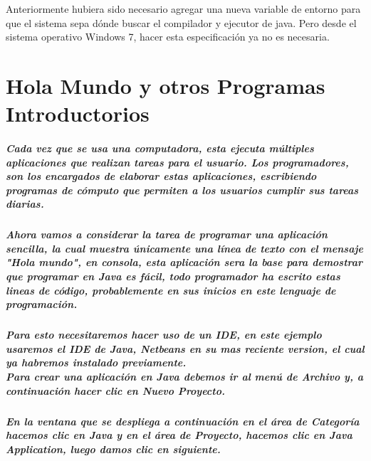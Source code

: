 \documentclass[12pt]{book} %
\begin{document}
Anteriormente hubiera sido necesario agregar una nueva variable de entorno para que el sistema sepa dónde buscar el compilador y ejecutor de java. Pero desde el sistema operativo Windows 7, hacer esta especificación ya no es necesaria.


\chapter{Hola Mundo y otros Programas Introductorios}

\paragraph{Cada vez que se usa una computadora, esta ejecuta múltiples aplicaciones que realizan tareas para el usuario. Los programadores, son los encargados de elaborar estas aplicaciones, escribiendo programas de cómputo que permiten a los usuarios cumplir sus tareas diarias.}
\paragraph{Ahora vamos a considerar la tarea de programar una aplicación sencilla, la cual muestra únicamente una línea de texto con el mensaje "Hola mundo", en consola, esta aplicación sera la base para demostrar que programar en Java es fácil, todo programador ha escrito estas lineas de código, probablemente en sus inicios en este lenguaje de programación.}
\paragraph{Para esto necesitaremos hacer uso de un IDE, en este ejemplo usaremos el IDE de Java, Netbeans en su mas reciente version, el cual ya habremos instalado previamente. \\Para crear una aplicación en Java debemos ir al menú de Archivo y, a continuación hacer clic en Nuevo Proyecto.}

\paragraph{En la ventana que se despliega a continuación en el área de Categoría hacemos clic en Java y en el área de Proyecto, hacemos clic en Java Application, luego damos clic en siguiente.}
\end{document}
